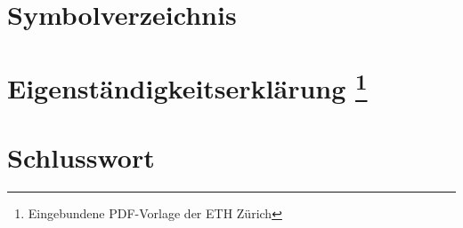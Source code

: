 \documentclass[twoside, 
               a4paper, 
               10pt, 
               parskip=full, 
               sectionentrydots=true, 
               listof=totoc, 
               listof=entryprefix,
               numbers=endperiod]{scrartcl}
\begin{document}

\newpage
\thispagestyle{empty}
\mbox{}

\newpage
\section*{Symbolverzeichnis}
\label{symbole} 





\newpage
\thispagestyle{empty}
\mbox{}

\newpage
{}
\section*{Eigenständigkeitserklärung
\footnote{Eingebundene PDF-Vorlage der ETH Zürich} 
\label{eigenstaendigkeitserklaerung}}
\begin{figure}

\end{figure}




\newpage
\thispagestyle{empty}
\mbox{}

\newpage
{}
\section*{Schlusswort}

\end{document}
